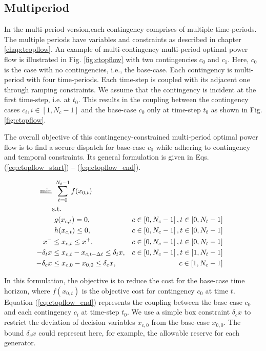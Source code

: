 \subsection{Multiperiod}

In the multi-period version,each contingency comprises of multiple time-periods. The multiple periods have variables and constraints as described in chapter \ref{chap:tcopflow}. An example of multi-contingency multi-period optimal power flow is illustrated in Fig. \ref{fig:ctopflow} with two contingencies $c_0$ and $c_1$. Here, $c_0$ is the case with no contingencies, i.e., the base-case. Each contingency is multi-period with four time-periods. Each time-step is coupled with its adjacent one through ramping constraints. We assume that the contingency is incident at the first time-step, i.e. at $t_0$. This results in the coupling between the contingency cases $c_i, i \in [1,N_c-1]$ and the base-case $c_0$ only at time-step $t_0$ as shown in Fig. \ref{fig:ctopflow}.



The overall objective of this contingency-constrained multi-period optimal power flow is to find a secure dispatch for base-case $c_0$ while adhering to contingency and temporal constraints. Its general formulation is given in Eqs. (\ref{eq:ctopflow_start}) -- (\ref{eq:ctopflow_end}).

\begin{align}
\centering
\text{min}&~\sum_{t=0}^{N_t-1}f(x_{0,t})&  \label{eq:ctopflow_start}\\
&\text{s.t.}& \nonumber \\
&~g(x_{c,t}) = 0,                                        &c \in \left[0,N_c-1\right], t \in \left[0,N_t-1\right]& \\
&~h(x_{c,t}) \le 0,                                      &c \in \left[0,N_c-1\right], t \in \left[0,N_t-1\right]& \\
x^- & \le x_{c,t} \le x^+,                               &c \in \left[0,N_c-1\right], t\in \left[0,N_t-1\right]& \\
-\delta_t{x} & \le x_{c,t} - x_{c,t-\Delta{t}} \le \delta_t{x},&c \in \left[0,N_c-1\right], t \in \left[1,N_t-1\right]& \label{eq:ctopflow_time_coupling}\\
-\delta_c{x} & \le x_{c,0} - x_{0,0} \le \delta_c{x},&c \in \left[1,N_c-1\right]& \\
\label{eq:ctopflow_end}
\end{align}

In this formulation, the objective is to reduce the cost for the base-case time horizon, where $f(x_{0,t})$ is the objective cost for contingency $c_0$ at time $t$. Equation (\ref{eq:ctopflow_end}) represents the coupling between the base case $c_0$ and each contingency $c_i$ at time-step $t_0$. We use a simple box constraint $\delta_c{x}$ to restrict the  deviation of decision variables $x_{c,0}$ from the base-case $x_{0,0}$. The bound $\delta_c{x}$ could represent here, for example, the allowable reserve for each generator.

